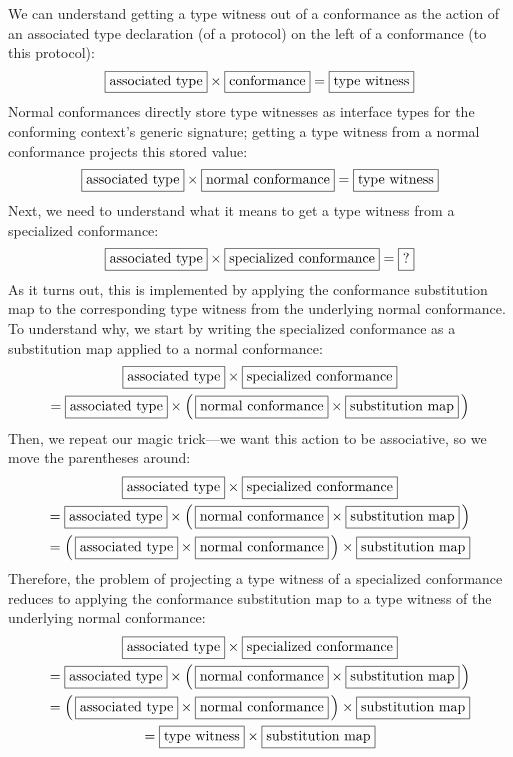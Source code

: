 \documentclass[a4paper,headsepline,bibliography=totoc,toc=flat,fleqn,twoside=semi]{scrbook}
\theoremstyle{definition}
\theoremstyle{definition}
\theoremstyle{definition}
\newcommand{\mathboxed}[1]{\boxed{\mbox{\vphantom{pI\texttt{pI}}#1}}}
\begin{document}
We can understand getting a type witness out of a conformance as the action of an associated type declaration (of a protocol) on the left of a conformance (to this protocol):
\[
\mathboxed{associated type} \times \mathboxed{conformance} = \mathboxed{type witness}
\]
Normal conformances directly store type witnesses as interface types for the conforming context's generic signature; getting a type witness from a normal conformance projects this stored value:
\[
\mathboxed{associated type} \times \mathboxed{normal conformance} = \mathboxed{type witness}
\]
Next, we need to understand what it means to get a type witness from a specialized conformance:
\[
\mathboxed{associated type} \times \mathboxed{specialized conformance} = \mathboxed{?}
\]
As it turns out, this is implemented by applying the conformance substitution map to the corresponding type witness from the underlying normal conformance. To understand why, we start by writing the specialized conformance as a substitution map applied to a normal conformance:
\begin{gather*}
\mathboxed{associated type} \times \mathboxed{specialized conformance}\\
= \mathboxed{associated type} \times \left(\,\mathboxed{normal conformance} \times \mathboxed{substitution map}\,\right)
\end{gather*}
Then, we repeat our magic trick---we want this action to be associative, so we move the parentheses around:
\begin{gather*}
\mathboxed{associated type} \times \mathboxed{specialized conformance}\\
= \mathboxed{associated type} \times \left(\,\mathboxed{normal conformance} \times \mathboxed{substitution map}\,\right)\\
= \left(\,\mathboxed{associated type} \times \mathboxed{normal conformance}\,\right) \times \mathboxed{substitution map}
\end{gather*}
Therefore, the problem of projecting a type witness of a specialized conformance reduces to applying the conformance substitution map to a type witness of the underlying normal conformance:
\begin{multline*}
\mathboxed{associated type} \times \mathboxed{specialized conformance}\\
= \mathboxed{associated type} \times \left(\,\mathboxed{normal conformance} \times \mathboxed{substitution map}\,\right)\\
= \left(\,\mathboxed{associated type} \times \mathboxed{normal conformance}\,\right) \times \mathboxed{substitution map}\\
= \mathboxed{type witness} \times \mathboxed{substitution map}
\end{multline*}
\end{document}
